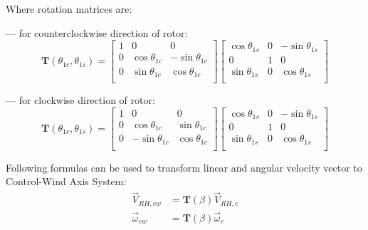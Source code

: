 Where rotation matrices are:

--- for counterclockwise direction of rotor:
\begin{equation}
  {\boldsymbol T} \left( \theta_{1c}, \theta_{1s} \right)
  =
  \left[
    \begin{matrix}
      1 &                0 &                 0 \\
      0 & \cos \theta_{1c} & -\sin \theta_{1c} \\
      0 & \sin \theta_{1c} &  \cos \theta_{1c} \\
    \end{matrix}
  \right]
  \left[
    \begin{matrix}
      \cos \theta_{1s} & 0 & -\sin \theta_{1s} \\
                    0 & 1 &                 0 \\
      \sin \theta_{1s} & 0 &  \cos \theta_{1s} \\
    \end{matrix}
  \right]
\end{equation}

--- for clockwise direction of rotor:
\begin{equation}
  {\boldsymbol T} \left( \theta_{1c}, \theta_{1s} \right)
  =
  \left[
    \begin{matrix}
      1 &                 0 &                0 \\
      0 &  \cos \theta_{1c} & \sin \theta_{1c} \\
      0 & -\sin \theta_{1c} & \cos \theta_{1c} \\
    \end{matrix}
  \right]
  \left[
    \begin{matrix}
      \cos \theta_{1s} & 0 & -\sin \theta_{1s} \\
                    0 & 1 &                 0 \\
      \sin \theta_{1s} & 0 &  \cos \theta_{1s} \\
    \end{matrix}
  \right]
\end{equation}

Following formulas can be used to transform linear and angular velocity vector to Control-Wind Axis System:
\begin{align}
  {\vec V}_{RH,cw}
  &=
  {\boldsymbol T} \left( \beta \right) {\vec V}_{RH,c} \\
  {\vec \omega}_{cw}
  &=
  {\boldsymbol T} \left( \beta \right) {\vec \omega}_c
\end{align}

